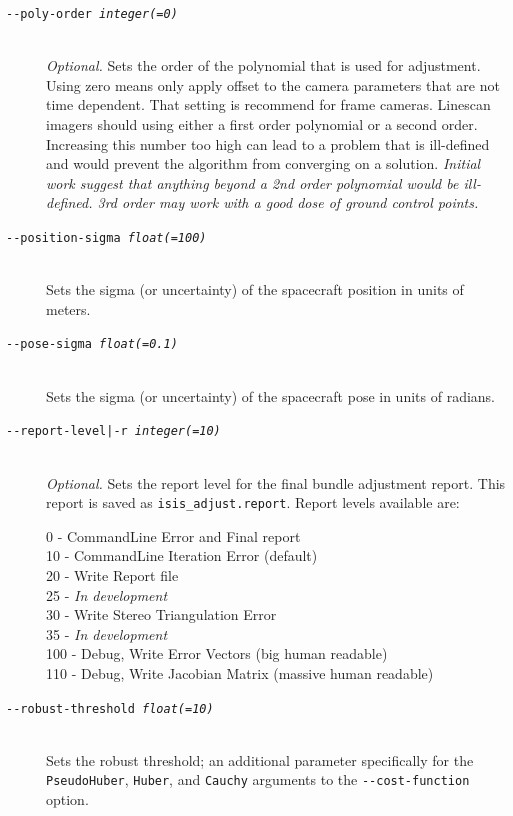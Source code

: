 \begin{description}
\item[\texttt{-\/-poly-order \textit{integer(=0)}}] \hfill \\
  \emph{Optional.} Sets the order of the polynomial that is used for
  adjustment. Using zero means only apply offset to the camera
  parameters that are not time dependent. That setting is recommend
  for frame cameras. Linescan imagers should using either a first
  order polynomial or a second order. Increasing this number too high can
  lead to a problem that is ill-defined and would prevent the algorithm
  from converging on a solution. \emph{Initial work suggest that anything
    beyond a 2nd order polynomial would be ill-defined. 3rd order may
    work with a good dose of ground control points.}

\item[\texttt{-\/-position-sigma \textit{float(=100)}}] \hfill \\
  Sets the sigma (or uncertainty) of the spacecraft position in
  units of meters.

\item[\texttt{-\/-pose-sigma \textit{float(=0.1)}}] \hfill \\
  Sets the sigma (or uncertainty) of the spacecraft pose in units
  of radians.

\item[\texttt{-\/-report-level|-r \textit{integer(=10)}}] \hfill \\
  \emph{Optional.} Sets the report level for the final bundle
  adjustment report.  This report is saved as
  \texttt{isis\_adjust.report}. Report levels available are:

  \begin{description}
    \item[0   - CommandLine Error and Final report]
    \item[10  - CommandLine Iteration Error (default)]
    \item[20  - Write Report file]
    \item[25  - \textnormal{\emph{In development}}]
    \item[30  - Write Stereo Triangulation Error]
    \item[35  - \textnormal{\emph{In development}}]
    \item[100 - Debug, Write Error Vectors (big human readable)]
    \item[110 - Debug, Write Jacobian Matrix (massive human readable)]
  \end{description}

\item[\texttt{-\/-robust-threshold \textit{float(=10)}}] \hfill \\
  Sets the robust threshold; an additional parameter specifically for
  the \texttt{PseudoHuber}, \texttt{Huber}, and \texttt{Cauchy} arguments to the   \texttt{-\/-cost-function} option.


\end{description}
